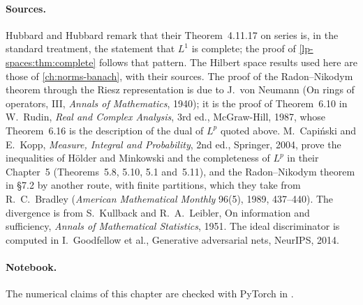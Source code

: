 \begin{notechapter}
\paragraph{Sources.} Hubbard and Hubbard remark that their
Theorem~4.11.17 on series is, in the standard treatment, the statement
that $L^1$ is complete; the proof of \cref{lp-spaces:thm:complete}
follows that pattern. The Hilbert space results used here are those of
\cref{ch:norms-banach}, with their sources. The proof of the
Radon--Nikodym theorem through the Riesz representation is due to
J.~von Neumann (On rings of operators, III, \emph{Annals of
Mathematics}, 1940); it is the proof of Theorem~6.10 in W.~Rudin,
\emph{Real and Complex Analysis}, 3rd ed., McGraw-Hill, 1987, whose
Theorem~6.16 is the description of the dual of $L^p$ quoted above.
M.~Capi\'nski and E.~Kopp,
\emph{Measure, Integral and Probability}, 2nd ed., Springer, 2004,
prove the inequalities of H\"older and Minkowski and the completeness
of $L^p$ in their Chapter~5 (Theorems~5.8, 5.10, 5.1 and~5.11), and
the Radon--Nikodym theorem in \S7.2 by another route, with finite
partitions, which they take from R.~C.~Bradley (\emph{American
Mathematical Monthly} 96(5), 1989, 437--440). The divergence is from
S.~Kullback and
R.~A.~Leibler, On information and sufficiency, \emph{Annals of
Mathematical Statistics}, 1951. The ideal discriminator is computed in
I.~Goodfellow et al., Generative adversarial nets, NeurIPS, 2014.

\paragraph{Notebook.} The numerical claims of this chapter are checked
with PyTorch in .


\end{notechapter}
